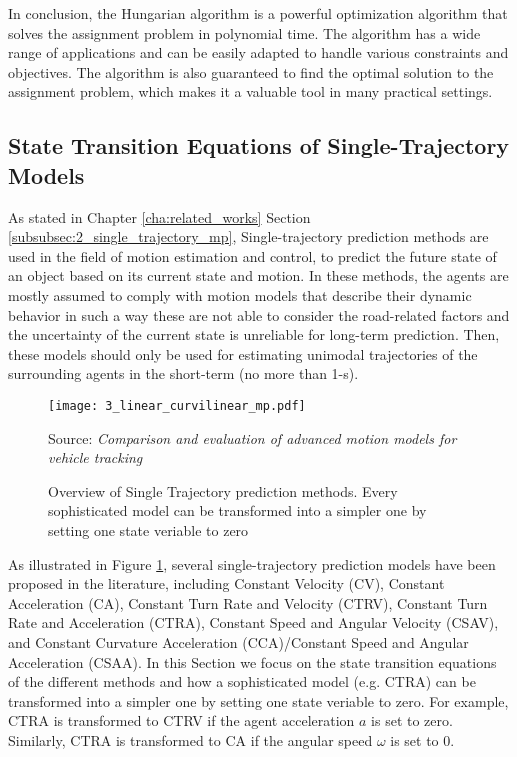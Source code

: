 In conclusion, the Hungarian algorithm is a powerful optimization algorithm that solves the assignment problem in polynomial time. The algorithm has a wide range of applications and can be easily adapted to handle various constraints and objectives. The algorithm is also guaranteed to find the optimal solution to the assignment problem, which makes it a valuable tool in many practical settings.
	
\subsection{State Transition Equations of Single-Trajectory Models}
\label{subsec:3_state_transitions_single_traj}

As stated in Chapter \ref{cha:related_works} Section \ref{subsubsec:2_single_trajectory_mp}, Single-trajectory prediction methods are used in the field of motion estimation and control, to predict the future state of an object based on its current state and motion. In these methods, the agents are mostly assumed to comply with motion models that describe their dynamic behavior in such a way these are not able to consider the road-related factors and the uncertainty of the current state is unreliable for long-term prediction. Then, these models should only be used for estimating unimodal trajectories of the surrounding agents in the short-term (no more than 1-s).

\begin{figure}[h]
	\centering
	\texttt{[image: 3\_linear\_curvilinear\_mp.pdf]}
	\caption[Overview of Single Trajectory prediction methods]{Overview of Single Trajectory prediction methods. Every sophisticated model can be transformed into a simpler one by setting one state veriable to zero}
	Source: \textit{Comparison and evaluation of advanced motion models for vehicle tracking} \cite{schubert2008comparison}
	\label{fig:3_linear_curvilinear_mp}
\end{figure}

As illustrated in Figure \ref{fig:3_linear_curvilinear_mp}, several single-trajectory prediction models have been proposed in the literature, including Constant Velocity (CV), Constant Acceleration (CA), Constant Turn Rate and Velocity (CTRV), Constant Turn Rate and Acceleration (CTRA), Constant Speed and Angular Velocity (CSAV), and Constant Curvature Acceleration (CCA)/Constant Speed and Angular Acceleration (CSAA). In this Section we focus on the state transition equations of the different methods and how a sophisticated model (e.g. CTRA) can be transformed into a simpler one by setting one state veriable to zero. For example, CTRA is transformed to CTRV if the agent acceleration $a$ is set to zero. Similarly, CTRA is transformed to CA if the angular speed $\omega$ is set to 0.

